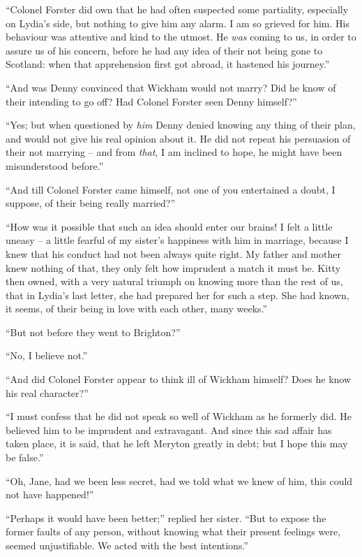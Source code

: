 “Colonel Forster did own that he had often suspected
some partiality, especially on Lydia’s side, but nothing
to give him any alarm. I am so grieved for him. His
behaviour was attentive and kind to the utmost. He \textit{was}
coming to us, in order to assure us of his concern, before he
had any idea of their not being gone to Scotland: when
that apprehension first got abroad, it hastened his journey.”

“And was Denny convinced that Wickham would not
marry? Did he know of their intending to go off? Had
Colonel Forster seen Denny himself?”

“Yes; but when questioned by \textit{him} Denny denied
knowing any thing of their plan, and would not give his
real opinion about it. He did not repeat his persuasion
of their not marrying -- and from \textit{that}, I am inclined to
hope, he might have been misunderstood before.”

“And till Colonel Forster came himself, not one of you
entertained a doubt, I suppose, of their being really
married?”

“How was it possible that such an idea should enter
our brains! I felt a little uneasy -- a little fearful of my
sister’s happiness with him in marriage, because I knew
that his conduct had not been always quite right. My
father and mother knew nothing of that, they only felt
how imprudent a match it must be. Kitty then owned,
with a very natural triumph on knowing more than the
rest of us, that in Lydia’s last letter, she had prepared
her for such a step. She had known, it seems, of their
being in love with each other, many weeks.”

“But not before they went to Brighton?”

“No, I believe not.”

“And did Colonel Forster appear to think ill of Wickham
himself? Does he know his real character?”

“I must confess that he did not speak so well of Wickham
as he formerly did. He believed him to be imprudent
and extravagant. And since this sad affair has taken
place, it is said, that he left Meryton greatly in debt; but
I hope this may be false.”

“Oh, Jane, had we been less secret, had we told what
we knew of him, this could not have happened!”

“Perhaps it would have been better;” replied her
sister. “But to expose the former faults of any person,
without knowing what their present feelings were, seemed
unjustifiable. We acted with the best intentions.”

